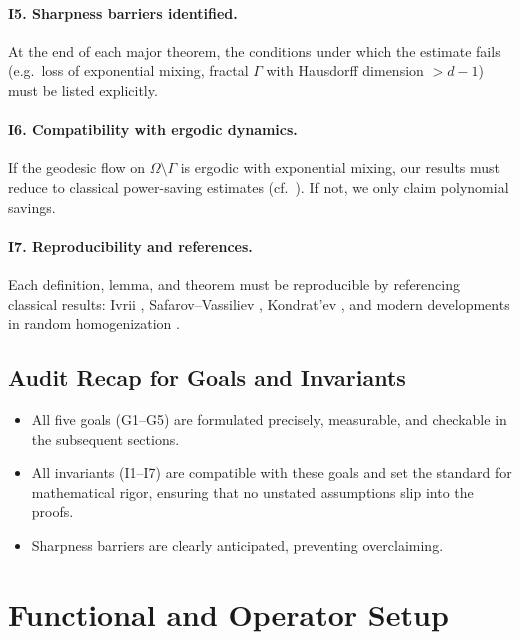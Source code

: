 \paragraph{I5. Sharpness barriers identified.}
At the end of each major theorem, the conditions under which the estimate
fails (e.g.\ loss of exponential mixing, fractal $\Gamma$ with Hausdorff
dimension $>d-1$) must be listed explicitly.

\paragraph{I6. Compatibility with ergodic dynamics.}
If the geodesic flow on $\Omega\setminus\Gamma$ is ergodic with exponential
mixing, our results must reduce to classical power-saving estimates
(cf.~\cite{DyatlovZworski2019}). If not, we only claim polynomial savings.

\paragraph{I7. Reproducibility and references.}
Each definition, lemma, and theorem must be reproducible by referencing
classical results: Ivrii \cite{Ivrii1998}, Safarov--Vassiliev
\cite{SafarovVassiliev1996}, Kondrat’ev \cite{Kondratev1967}, and modern
developments in random homogenization \cite{ArmstrongMourrat2016}.

\subsection*{Audit Recap for Goals and Invariants}

\begin{itemize}
  \item All five goals (G1–G5) are formulated precisely, measurable, and
  checkable in the subsequent sections.
  \item All invariants (I1–I7) are compatible with these goals and set the
  standard for mathematical rigor, ensuring that no unstated assumptions
  slip into the proofs.
  \item Sharpness barriers are clearly anticipated, preventing overclaiming.
\end{itemize}

\section*{Functional and Operator Setup}
\label{sec:functional-operator-setup}

